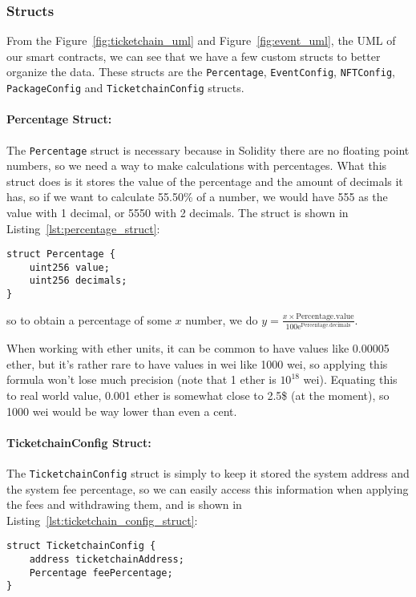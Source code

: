 \subsubsection{Structs}\label{subsubsec:structs}

From the Figure~\ref{fig:ticketchain_uml} and Figure~\ref{fig:event_uml}, the
UML of our smart contracts, we can see that we have a few custom structs to
better organize the data. These structs are the \texttt{Percentage},
\texttt{EventConfig}, \texttt{NFTConfig}, \texttt{PackageConfig} and
\texttt{TicketchainConfig} structs.

\paragraph{Percentage Struct:} The \texttt{Percentage} struct is necessary because in Solidity there are no
floating point numbers, so we need a way to make calculations with percentages.
What this struct does is it stores the value of the percentage and the amount
of decimals it has, so if we want to calculate 55.50\% of a number, we would
have 555 as the value with 1 decimal, or 5550 with 2 decimals. The struct is
shown in Listing~\ref{lst:percentage_struct}:
\begin{lstlisting}[caption=Percentage struct,label={lst:percentage_struct}]
struct Percentage {
	uint256 value;
	uint256 decimals;
}
\end{lstlisting}
so to obtain a percentage of some $x$ number, we do $y = \frac{x \times
		\text{Percentage.value}}{100\mathrm{e}^\text{Percentage.decimals}}$.

When working with ether units, it can be common to have values like 0.00005
ether, but it's rather rare to have values in wei like 1000 wei, so applying
this formula won't lose much precision (note that 1 ether is $10^{18}$ wei).
Equating this to real world value, 0.001 ether is somewhat close to 2.5\$ (at
the moment), so 1000 wei would be way lower than even a cent.

\paragraph{TicketchainConfig Struct:} The \texttt{TicketchainConfig} struct is simply to keep it stored the system
address and the system fee percentage, so we can easily access this information
when applying the fees and withdrawing them, and is shown in
Listing~\ref{lst:ticketchain_config_struct}:
\begin{lstlisting}[caption=TicketchainConfig struct,label={lst:ticketchain_config_struct}]
struct TicketchainConfig {
    address ticketchainAddress;
    Percentage feePercentage;
}
\end{lstlisting}

